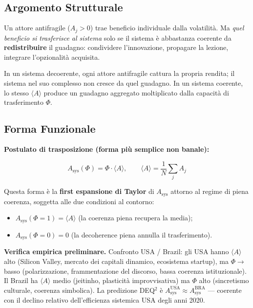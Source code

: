 \subsection{Argomento Strutturale}\label{argomento-structural}

Un attore antifragile (\(A_j > 0\)) trae beneficio individuale dalla
volatilità. Ma \emph{quel beneficio si trasferisce al sistema} solo se
il sistema è abbastanza coerente da \textbf{redistribuire} il guadagno:
condividere l'innovazione, propagare la lezione, integrare l'opzionalità
acquisita.

In un sistema decoerente, ogni attore antifragile cattura la propria
rendita; il sistema nel suo complesso non cresce da quel guadagno. In un
sistema coerente, lo stesso \(\langle A \rangle\) produce un guadagno
aggregato moltiplicato dalla capacità di trasferimento \(\Phi\).

\subsection{Forma Funzionale}\label{forma-funzionale}

\Hypoth{} \textbf{Postulato di trasposizione (forma più semplice non
banale):}

\[
A_{\text{sys}}(\Phi) = \Phi \cdot \langle A \rangle, \qquad \langle A \rangle = \frac{1}{N}\sum_j A_j
\]

Questa forma è la \textbf{first espansione di Taylor} di
\(A_{\text{sys}}\) attorno al regime di piena coerenza, soggetta alle
due condizioni al contorno:

\begin{itemize}
\tightlist
\item
  \(A_{\text{sys}}(\Phi = 1) = \langle A \rangle\) (la coerenza piena
  recupera la media);
\item
  \(A_{\text{sys}}(\Phi = 0) = 0\) (la decoherence piena annulla il
  trasferimento).
\end{itemize}

\Proved{} \textbf{Verifica empirica preliminare.} Confronto USA /
Brazil: gli USA hanno \(\langle A \rangle\) alto (Silicon Valley,
mercato dei capitali dinamico, ecosistema startup), ma \(\Phi \to\)
basso (polarizzazione, frammentazione del discorso, bassa coerenza
istituzionale). Il Brazil ha \(\langle A \rangle\) medio (jeitinho,
plasticità improvvisativa) ma \(\Phi\) alto (sincretismo culturale,
coerenza simbolica). La predizione DEQ$^2$ è
\(A_{\text{sys}}^{\text{USA}} \approx A_{\text{sys}}^{\text{BRA}}\) ---
coerente con il declino relativo dell'efficienza sistemica USA degli
anni 2020.

